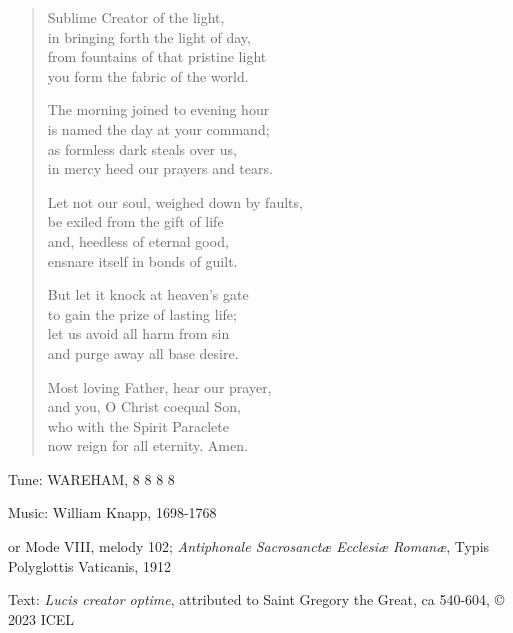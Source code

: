 \hymn

\begin{verse}
Sublime Creator of the light,\\
in bringing forth the light of day,\\
from fountains of that pristine light\\
you form the fabric of the world.

The morning joined to evening hour\\
is named the day at your command;\\
as formless dark steals over us,\\
in mercy heed our prayers and tears.

Let not our soul, weighed down by faults,\\
be exiled from the gift of life\\
and, heedless of eternal good,\\
ensnare itself in bonds of guilt.

But let it knock at heaven’s gate\\
to gain the prize of lasting life;\\
let us avoid all harm from sin\\
and purge away all base desire.

Most loving Father, hear our prayer,\\
and you, O Christ coequal Son,\\
who with the Spirit Paraclete\\
now reign for all eternity. Amen.
\end{verse}

\begin{hymnsource}
Tune: WAREHAM, 8 8 8 8

Music: William Knapp, 1698-1768

or Mode VIII, melody 102; \emph{Antiphonale Sacrosanctæ Ecclesiæ Romanæ}, Typis Polyglottis Vaticanis, 1912

Text: \emph{Lucis creator optime}, attributed to Saint Gregory the Great, ca 540-604, © 2023 ICEL
\end{hymnsource}